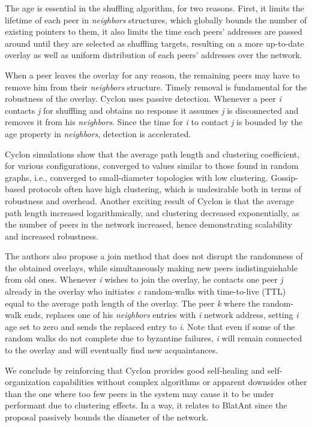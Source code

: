 \documentclass[runningheads]{llncs}
\begin{document}
The age is essential in the shuffling algorithm, for two reasons. First, it limits the lifetime of each peer in \textit{neighbors} structures, which globally bounds the number of existing pointers to them, it also limits the time each peers' addresses are passed around until they are selected as shuffling targets, resulting on a more up-to-date overlay as well as uniform distribution of each peers' addresses over the network.

When a peer leaves the overlay for any reason, the remaining peers may have to remove him from their \textit{neighbors} structure. Timely removal is fundamental for the robustness of the overlay.  Cyclon uses passive detection. Whenever a peer \textit{i} contacts \textit{j} for shuffling and obtains no response it assumes \textit{j} is disconnected and removes it from his \textit{neighbors}. Since the time for \textit{i} to contact \textit{j} is bounded by the age property in \textit{neighbors}, detection is accelerated.

Cyclon simulations show that the average path length and clustering coefficient, for various configurations, converged to values similar to those found in random graphs, i.e., converged to small-diameter topologies with low clustering. Gossip-based protocols often have high clustering, which is undesirable both in terms of robustness and overhead. Another exciting result of Cyclon is that the average path length increased logarithmically, and clustering decreased exponentially, as the number of peers in the network increased, hence demonstrating scalability and increased robustness.

The authors also propose a join method that does not disrupt the randomness of the obtained overlays, while simultaneously making new peers indistinguishable from old ones. Whenever \textit{i} wishes to join the overlay, he contacts one peer \textit{j} already in the overlay who initiates \textit{c} random-walks with time-to-live (TTL) equal to the average path length of the overlay. The peer \textit{k} where the random-walk ends, replaces one of his \textit{neighbors} entries with \textit{i} network address, setting \textit{i} age set to zero and sends the replaced entry to \textit{i}. Note that even if some of the random walks do not complete due to byzantine failures, \textit{i} will remain connected to the overlay and will eventually find new acquaintances.

We conclude by reinforcing that Cyclon provides good self-healing and self-organization capabilities without complex algorithms or apparent downsides other than the one where too few peers in the system may cause it to be under performant due to clustering effects. In a way, it relates to BlatAnt since the proposal passively bounds the diameter of the network.
\end{document}
